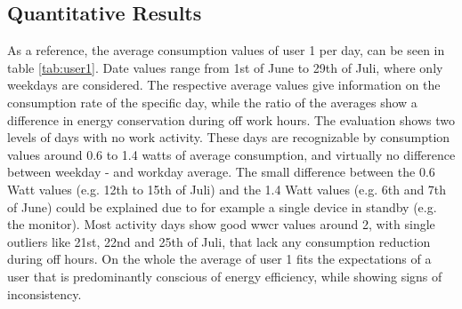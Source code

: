 \subsection{Quantitative Results}\label{subsec:result_tables}
As a reference, the average consumption values of user 1 per day, can be seen in table \ref{tab:user1}. Date values range from 1st of June to 29th of Juli, where only weekdays are considered. The respective average values give information on the consumption rate of the specific day, while the ratio of the averages show a difference in energy conservation during off work hours. The evaluation shows two levels of days with no work activity. These days are recognizable by consumption values around 0.6 to 1.4 watts of average consumption, and virtually no difference between weekday - and workday average. The small difference between the 0.6 Watt values (e.g. 12th to 15th of Juli) and the 1.4 Watt values (e.g. 6th and 7th of June) could be explained due to for example a single device in standby (e.g. the monitor). Most activity days show good \acrshort{wwcr} values around 2, with single outliers like 21st, 22nd and 25th of Juli, that lack any consumption reduction during off hours. On the whole the average of user 1 fits the expectations of a user that is predominantly conscious of energy efficiency, while showing signs of inconsistency.\\
